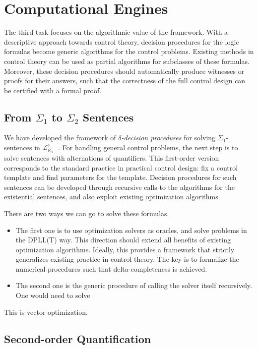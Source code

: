 \documentclass[10pt]{article}
\newcommand{\lrf}{\mathcal{L}_{\mathbb{R}_{\mathcal{F}}}}
\theoremstyle{definition}
\begin{document}
\section{Computational Engines}


The third task focuses on the algorithmic value of the framework. With a descriptive approach towards control theory, decision procedures for the logic formulas become generic algorithms for the control problems. Existing methods in control theory can be used as partial algorithms for subclasses of these formulas. Moreover, these decision procedures should automatically produce witnesses or proofs for their answers, such that the correctness of the full control design can be certified with a formal proof.

\subsection{From $\Sigma_1$ to $\Sigma_2$ Sentences} 

We have developed the framework of {\em $\delta$-decision procedures} for solving $\Sigma_1$-sentences in $\lrf^1$~\cite{DBLP:conf/cade/GaoAC12}. For handling general control problems, the next step is to solve sentences with alternations of quantifiers. This first-order version corresponds to the standard practice in practical control design: fix a control template and find parameters for the template. Decision procedures for such sentences can be developed through recursive calls to the algorithms for the existential sentences, and also exploit existing optimization algorithms. 

There are two ways we can go to solve these formulas. 
\begin{itemize}
\item The first one is to use optimization solvers as oracles, and solve problems in the DPLL(T) way. This direction should extend all benefits of existing optimization algorithms. Ideally, this provides a framework that strictly generalizes existing practice in control theory. The key is to formalize the numerical procedures such that delta-completeness is achieved. 
\item The second one is the generic procedure of calling the solver itself recursively. One would need to solve 
\end{itemize}

This is vector optimization.  

\subsection{Second-order Quantification} 
\end{document}
